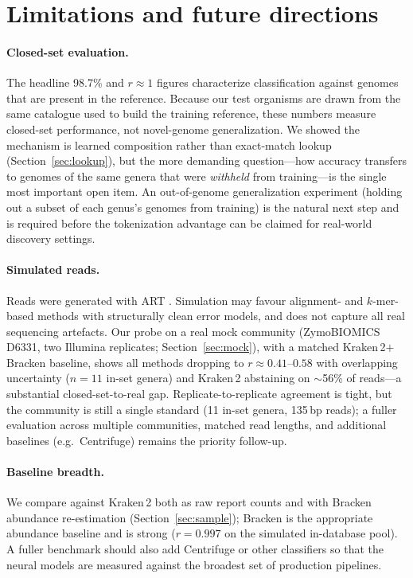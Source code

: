 \section{Limitations and future directions}
\label{sec:limitations}

\paragraph{Closed-set evaluation.}
The headline 98.7\% and $r\!\approx\!1$ figures characterize classification
against genomes that are present in the reference. Because our test organisms
are drawn from the same catalogue used to build the training reference, these
numbers measure closed-set performance, not novel-genome generalization. We
showed the mechanism is learned composition rather than exact-match lookup
(Section~\ref{sec:lookup}), but the more demanding question---how accuracy
transfers to genomes of the same genera that were \emph{withheld} from
training---is the single most important open item. An out-of-genome
generalization experiment (holding out a subset of each genus's genomes from
training) is the natural next step and is required before the tokenization
advantage can be claimed for real-world discovery settings.

\paragraph{Simulated reads.}
Reads were generated with ART \citep{Huang2012}. Simulation may favour
alignment- and $k$-mer-based methods with structurally clean error models, and
does not capture all real sequencing artefacts. Our probe on a real mock
community (ZymoBIOMICS D6331, two Illumina replicates; Section~\ref{sec:mock}),
with a matched Kraken\,2$+$Bracken baseline, shows all methods dropping to
$r\approx0.41$--$0.58$ with overlapping uncertainty ($n{=}11$ in-set genera) and
Kraken\,2 abstaining on $\sim$56\% of reads---a substantial closed-set-to-real
gap. Replicate-to-replicate agreement is tight, but the community is still a
single standard (11 in-set genera, 135\,bp reads); a fuller evaluation across
multiple communities, matched read lengths, and additional baselines
(e.g.\ Centrifuge) remains the priority follow-up.

\paragraph{Baseline breadth.}
We compare against Kraken\,2 both as raw report counts and with Bracken
\citep{Lu2017} abundance re-estimation (Section~\ref{sec:sample}); Bracken is the
appropriate abundance baseline and is strong ($r=0.997$ on the simulated
in-database pool). A fuller benchmark should also add Centrifuge
\citep{Kim2016} or other classifiers so that the neural models are measured
against the broadest set of production pipelines.

